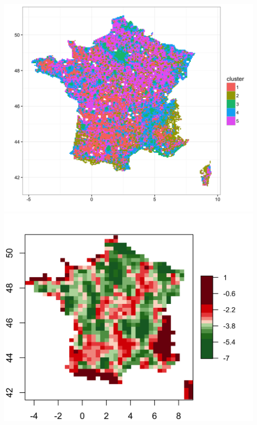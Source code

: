 \documentclass[english,11pt]{beamer}
\begin{document}
{\begin{columns}
\centering
\includegraphics[width=\textwidth]{figures/morpho_cluster_map_k5_full.png}\\
\includegraphics[width=\textwidth]{figures/morpho_corr_PCA_rhoasize12.png}


\end{columns}}
\end{document}
